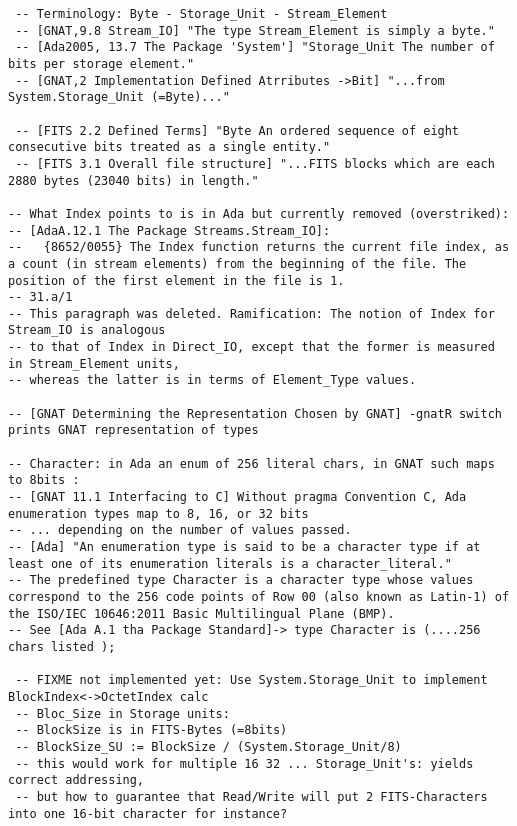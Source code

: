\documentclass[a4paper,10pt]{article}
\begin{document}
\begin{verbatim}
 -- Terminology: Byte - Storage_Unit - Stream_Element
 -- [GNAT,9.8 Stream_IO] "The type Stream_Element is simply a byte."
 -- [Ada2005, 13.7 The Package 'System'] "Storage_Unit The number of bits per storage element."
 -- [GNAT,2 Implementation Defined Atrributes ->Bit] "...from System.Storage_Unit (=Byte)..."

 -- [FITS 2.2 Defined Terms] "Byte An ordered sequence of eight consecutive bits treated as a single entity."
 -- [FITS 3.1 Overall file structure] "...FITS blocks which are each 2880 bytes (23040 bits) in length."

-- What Index points to is in Ada but currently removed (overstriked):
-- [AdaA.12.1 The Package Streams.Stream_IO]:
--   {8652/0055} The Index function returns the current file index, as a count (in stream elements) from the beginning of the file. The position of the first element in the file is 1.
-- 31.a/1
-- This paragraph was deleted. Ramification: The notion of Index for Stream_IO is analogous
-- to that of Index in Direct_IO, except that the former is measured in Stream_Element units,
-- whereas the latter is in terms of Element_Type values.

-- [GNAT Determining the Representation Chosen by GNAT] -gnatR switch prints GNAT representation of types

-- Character: in Ada an enum of 256 literal chars, in GNAT such maps to 8bits :
-- [GNAT 11.1 Interfacing to C] Without pragma Convention C, Ada enumeration types map to 8, 16, or 32 bits
-- ... depending on the number of values passed.
-- [Ada] "An enumeration type is said to be a character type if at least one of its enumeration literals is a character_literal."
-- The predefined type Character is a character type whose values correspond to the 256 code points of Row 00 (also known as Latin-1) of the ISO/IEC 10646:2011 Basic Multilingual Plane (BMP).
-- See [Ada A.1 tha Package Standard]-> type Character is (....256 chars listed );

 -- FIXME not implemented yet: Use System.Storage_Unit to implement BlockIndex<->OctetIndex calc
 -- Bloc_Size in Storage units:
 -- BlockSize is in FITS-Bytes (=8bits)
 -- BlockSize_SU := BlockSize / (System.Storage_Unit/8)
 -- this would work for multiple 16 32 ... Storage_Unit's: yields correct addressing,
 -- but how to guarantee that Read/Write will put 2 FITS-Characters into one 16-bit character for instance?
\end{verbatim}
\end{document}
